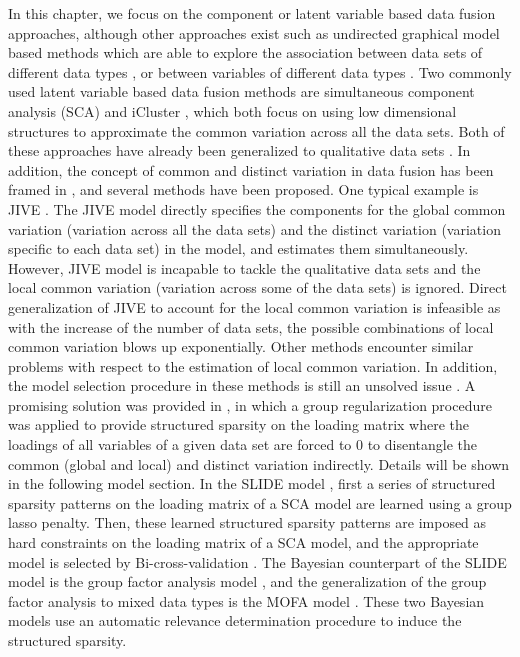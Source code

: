 In this chapter, we focus on the component or latent variable based data fusion approaches, although other approaches exist such as undirected graphical model based methods which are able to explore the association between data sets of different data types \cite{aben2018itop}, or between variables of different data types \cite{lee2015learning,cheng2017high}. Two commonly used latent variable based data fusion methods are simultaneous component analysis (SCA) \cite{van2009structured} and iCluster \cite{shen2009integrative}, which both focus on using low dimensional structures to approximate the common variation across all the data sets. Both of these approaches have already been generalized to qualitative data sets \cite{mo2013pattern,song2018generalized}. In addition, the concept of common and distinct variation in data fusion has been framed in \cite{van2016separating,smilde2017common}, and several methods \cite{lock2013joint,lofstedt2013global,schouteden2014performing,maage2012preference,smilde2017common} have been proposed. One typical example is JIVE \cite{lock2013joint}. The JIVE model directly specifies the components for the global common variation (variation across all the data sets) and the distinct variation (variation specific to each data set) in the model, and estimates them simultaneously. However, JIVE model is incapable to tackle the qualitative data sets and the local common variation (variation across some of the data sets) is ignored. Direct generalization of JIVE to account for the local common variation is infeasible as with the increase of the number of data sets, the possible combinations of local common variation blows up exponentially. Other methods \cite{schouteden2014performing,lofstedt2013global} encounter similar problems with respect to the estimation of local common variation. In addition, the model selection procedure in these methods is still an unsolved issue \cite{maage2018performance}. A promising solution was provided in \cite{klami2015group,gaynanova2017structural}, in which a group regularization procedure was applied to provide structured sparsity on the loading matrix where the loadings of all variables of a given data set are forced to 0 to disentangle the common (global and local) and distinct variation indirectly. Details will be shown in the following model section. In the SLIDE model \cite{gaynanova2017structural}, first a series of structured sparsity patterns on the loading matrix of a SCA model are learned using a group lasso penalty. Then, these learned structured sparsity patterns are imposed as hard constraints on the loading matrix of a SCA model, and the appropriate model is selected by Bi-cross-validation \cite{perry2009cross}. The Bayesian counterpart of the SLIDE model is the group factor analysis model \cite{klami2015group}, and the generalization of the group factor analysis to mixed data types is the MOFA model \cite{argelaguet2018multi}. These two Bayesian models use an automatic relevance determination procedure to induce the structured sparsity.

